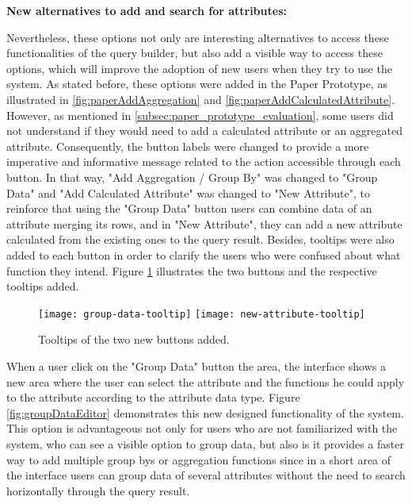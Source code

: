 \medskip

\textbf{New alternatives to add and search for attributes:}

\medskip

Nevertheless, these options not only are interesting alternatives to access these functionalities of the query builder, but also add a visible way to access these options, which will improve the adoption of new users when they try to use the system. As stated before, these options were added in the Paper Prototype, as illustrated in \ref{fig:paperAddAggregation} and \ref{fig:paperAddCalculatedAttribute}. However, as mentioned in \ref{subsec:paper_prototype_evaluation}, some users did not understand if they would need to add a calculated attribute or an aggregated attribute. Consequently, the button labels were changed to provide a more imperative and informative message related to the action accessible through each button. In that way, "Add Aggregation / Group By" was changed to "Group Data" and "Add Calculated Attribute" was changed to "New Attribute", to reinforce that using the "Group Data" button users can combine data of an attribute merging its rows, and in "New Attribute", they can add a new attribute calculated from the existing ones to the query result. Besides, tooltips were also added to each button in order to clarify the users who were confused about what function they intend. Figure \ref{fig:newButtonsTooltips} illustrates the two buttons and the respective tooltips added.


\begin{figure}[tb]
  \centering
    {\texttt{[image: group-data-tooltip]}}%
    {\texttt{[image: new-attribute-tooltip]}}%
\caption{Tooltips of the two new buttons added.}
  \label{fig:newButtonsTooltips}
\end{figure}

When a user click on the "Group Data" button the area, the interface shows a new area where the user can select the attribute and the functions he could apply to the attribute according to the attribute data type. Figure \ref{fig:groupDataEditor} demonstrates this new designed functionality of the system. This option is advantageous not only for users who are not familiarized with the system, who can see a visible option to group data, but also is it provides a faster way to add multiple group bys or aggregation functions since in a short area of the interface users can group data of several attributes without the need to search horizontally through the query result.

